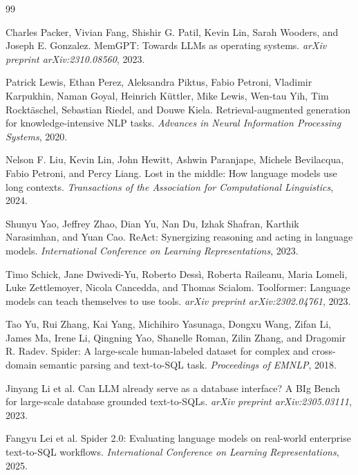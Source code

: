 \documentclass[sigconf,nonacm]{acmart}
\begin{document}
\begin{thebibliography}{99}

Charles Packer, Vivian Fang, Shishir G. Patil, Kevin Lin, Sarah Wooders, and Joseph E. Gonzalez.
\newblock MemGPT: Towards LLMs as operating systems.
\newblock \emph{arXiv preprint arXiv:2310.08560}, 2023.

Patrick Lewis, Ethan Perez, Aleksandra Piktus, Fabio Petroni, Vladimir Karpukhin, Naman Goyal, Heinrich K\"uttler, Mike Lewis, Wen-tau Yih, Tim Rockt\"aschel, Sebastian Riedel, and Douwe Kiela.
\newblock Retrieval-augmented generation for knowledge-intensive NLP tasks.
\newblock \emph{Advances in Neural Information Processing Systems}, 2020.

Nelson F. Liu, Kevin Lin, John Hewitt, Ashwin Paranjape, Michele Bevilacqua, Fabio Petroni, and Percy Liang.
\newblock Lost in the middle: How language models use long contexts.
\newblock \emph{Transactions of the Association for Computational Linguistics}, 2024.

Shunyu Yao, Jeffrey Zhao, Dian Yu, Nan Du, Izhak Shafran, Karthik Narasimhan, and Yuan Cao.
\newblock ReAct: Synergizing reasoning and acting in language models.
\newblock \emph{International Conference on Learning Representations}, 2023.

Timo Schick, Jane Dwivedi-Yu, Roberto Dess\`i, Roberta Raileanu, Maria Lomeli, Luke Zettlemoyer, Nicola Cancedda, and Thomas Scialom.
\newblock Toolformer: Language models can teach themselves to use tools.
\newblock \emph{arXiv preprint arXiv:2302.04761}, 2023.

Tao Yu, Rui Zhang, Kai Yang, Michihiro Yasunaga, Dongxu Wang, Zifan Li, James Ma, Irene Li, Qingning Yao, Shanelle Roman, Zilin Zhang, and Dragomir R. Radev.
\newblock Spider: A large-scale human-labeled dataset for complex and cross-domain semantic parsing and text-to-SQL task.
\newblock \emph{Proceedings of EMNLP}, 2018.

Jinyang Li et al.
\newblock Can LLM already serve as a database interface? A BIg Bench for large-scale database grounded text-to-SQLs.
\newblock \emph{arXiv preprint arXiv:2305.03111}, 2023.

Fangyu Lei et al.
\newblock Spider 2.0: Evaluating language models on real-world enterprise text-to-SQL workflows.
\newblock \emph{International Conference on Learning Representations}, 2025.


\end{thebibliography}
\end{document}
